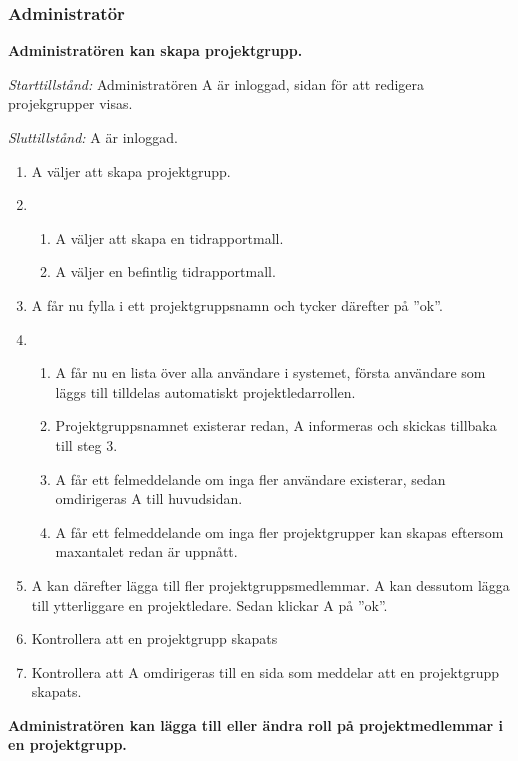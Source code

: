\documentclass[a4paper]{article}
\begin{document}
\subsubsection{Administratör}

\begin{ST}

\item
\textbf{Administratören kan skapa projektgrupp.}

\emph{Starttillstånd:} Administratören A är inloggad, sidan för att redigera projekgrupper visas.

\emph{Sluttillstånd:} A är inloggad.

\begin{enumerate}
\item A väljer att skapa projektgrupp.
\item
\begin{enumerate}
\item A väljer att skapa en tidrapportmall.
\item A väljer en befintlig tidrapportmall.
\end{enumerate}
\item A får nu fylla i ett projektgruppsnamn och tycker därefter på ''ok''.
\item 
\begin{enumerate}
\item A får nu en lista över alla användare i systemet, första användare som läggs till tilldelas automatiskt projektledarrollen.
\item Projektgruppsnamnet existerar redan, A informeras och skickas tillbaka till steg 3.
\item A får ett felmeddelande om inga fler användare existerar, sedan omdirigeras A till huvudsidan.
\item A får ett felmeddelande om inga fler projektgrupper kan skapas eftersom maxantalet redan är uppnått.
\end{enumerate}
\item A kan därefter lägga till fler projektgruppsmedlemmar. A kan dessutom lägga till ytterliggare en projektledare. Sedan klickar A på ''ok''.
\item Kontrollera att en projektgrupp skapats
\item Kontrollera att A omdirigeras till en sida som meddelar att en projektgrupp skapats.
\end{enumerate}

\item
\textbf{Administratören kan lägga till eller ändra roll på projektmedlemmar i en projektgrupp.}


\end{ST}
\end{document}
